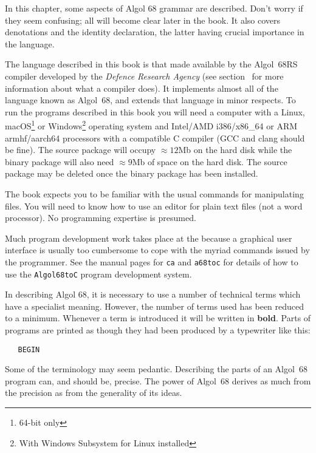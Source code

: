 In this chapter, some aspects of Algol 68 grammar are described.
Don't worry if they seem confusing; all will become clear later in
the book.  It also covers denotations and the identity declaration,
the latter having crucial importance in the language.

The language described in this book is that made available by the
 Algol~68RS compiler developed by the
\emph{Defence Research Agency} (see section~ for more
information about what a compiler does).
It implements almost all of
the language known as Algol~68, and extends that language in minor
respects.
To run the programs described in this book you will need a
computer with a Linux, macOS\footnote{64-bit only} or
Windows\footnote{With Windows Subsystem for Linux installed} operating system and
Intel/AMD i386/x86\_64 or ARM armhf/aarch64 processors with a compatible
C compiler (GCC and clang should be fine).
The source package will occupy
$\approx12$Mb on the hard disk while the binary package will also need
$\approx9$Mb of space on the hard disk. The source package may be
deleted once the binary package has been installed.

The book expects you to be familiar with the usual commands for
manipulating files. You will need to know how to use an editor for
plain text files (not a word processor).  No programming expertise is
presumed.

Much program development work takes place at the  because a graphical user interface is usually too cumbersome to
cope with the myriad commands issued by the programmer.  See the
manual pages for \verb|ca| and \verb|a68toc| for details of how to
use the \verb|Algol68toC| program development system.

In describing Algol 68, it is necessary to use a number of technical
terms which have a specialist meaning. However, the number of terms
used has been reduced to a minimum. Whenever a term is introduced it
will be written in \textbf{bold}. Parts of programs are printed as though
they had been produced by a typewriter like this:
\begin{verbatim}
   BEGIN
\end{verbatim}
\noindent
Some of the terminology may seem pedantic. Describing the parts of an
Algol~68 program can, and should be, precise. The power of Algol~68
derives as much from the precision as from the generality of its ideas.

